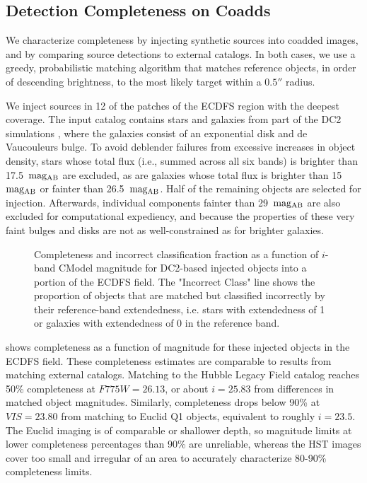 \subsection{Detection Completeness on Coadds}
\label{ssec:detection_completeness}
We characterize completeness by injecting synthetic sources into coadded images, and by comparing source detections to external catalogs.
In both cases, we use a greedy, probabilistic matching \gls{algorithm} that matches reference objects, in order of descending brightness, to the most likely target within a $0.5''$ radius.

We inject sources in 12 of the patches of the \gls{ECDFS} region with the deepest coverage.
The input catalog contains stars and galaxies from part of the \gls{DC2} simulations \citep{2021ApJS..253...31L}, where the galaxies consist of an exponential disk and de Vaucouleurs \citep{1948AnAp...11..247D,1953MNRAS.113..134D} bulge.
To avoid deblender failures from excessive increases in object density, stars whose total \gls{flux} (i.e., summed across all six bands) is brighter than 17.5~${\rm mag_{\rm AB}}$ are excluded, as are galaxies whose total \gls{flux} is brighter than 15~${\rm mag_{AB}}$ or fainter than 26.5~${\rm mag_{AB}}$.
Half of the remaining objects are selected for injection.
Afterwards, individual components fainter than 29~${\rm mag_{AB}}$ are also excluded for computational expediency, and because the properties of these very faint bulges and disks are not as well-constrained as for brighter galaxies.
\begin{figure}[htb]
\caption{Completeness and incorrect classification fraction as a function of $i$-band CModel magnitude for DC2-based injected objects into a portion of the ECDFS field. 
The "Incorrect Class" line shows the proportion of objects that are matched but classified incorrectly by their reference-band extendedness, i.e. stars with extendedness of 1 or galaxies with extendedness of 0 in the reference band.}
\label{fig:injected_lsst_cells_v1_5063_i_completeness_any}
\end{figure}

 shows completeness as a function of magnitude for these injected objects in the \gls{ECDFS} field.
These completeness estimates are comparable to results from matching external catalogs. 
Matching to the Hubble Legacy Field catalog \citep{2016arXiv160600841I, 2019ApJS..244...16W} reaches 50\% completeness at $F775W=26.13$, or about $i=25.83$ from differences in matched object magnitudes.
Similarly, completeness drops below 90\% at $VIS=23.80$ from matching to Euclid Q1 \citep{2025arXiv250315305E} objects, equivalent to roughly $i=23.5$. 
The Euclid imaging is of comparable or shallower depth, so magnitude limits at lower completeness percentages than 90\% are unreliable, whereas the HST images cover too small and irregular of an area to accurately characterize 80-90\% completeness limits.


